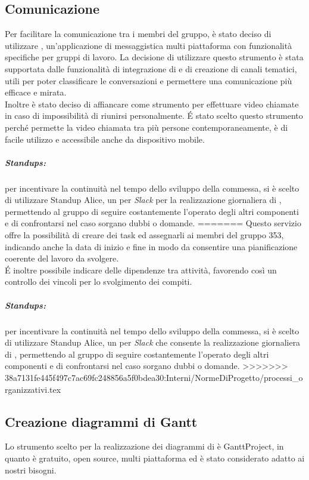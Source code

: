 \documentclass[NormeDiProgetto.tex]{subfiles}
\begin{document}
	\subsection{Comunicazione}
	Per facilitare la comunicazione tra i membri del gruppo, è stato deciso di utilizzare , un'applicazione di messaggistica multi piattaforma con funzionalità specifiche per gruppi di lavoro. La decisione di utilizzare questo strumento è stata supportata dalle funzionalità di integrazione di  e di creazione di canali tematici, utili per poter classificare le conversazioni e permettere una comunicazione più efficace e mirata.\\
	Inoltre è stato deciso di affiancare  come strumento per effettuare video chiamate in caso di impossibilità di riunirsi personalmente. \'{E} stato scelto questo strumento perché permette la video chiamata tra più persone contemporaneamente, è di facile utilizzo e accessibile anche da dispositivo mobile.\\
	\subparagraph{Standups:} per incentivare la continuità nel tempo dello sviluppo della commessa, si è scelto di utilizzare Standup Alice, un  per \emph{Slack} per la realizzazione giornaliera di , permettendo al gruppo di seguire costantemente l'operato degli altri componenti e di confrontarsi nel caso sorgano dubbi o domande.
=======
	Questo servizio offre la possibilità di creare dei task ed assegnarli ai membri del gruppo 353, indicando anche la data di inizio e fine in modo da consentire una pianificazione coerente del lavoro da svolgere.\\
	\'{E} inoltre possibile indicare delle dipendenze tra attività, favorendo così un controllo dei vincoli per lo svolgimento dei compiti.\\

	\subparagraph{Standups:} per incentivare la continuità nel tempo dello sviluppo della commessa, si è scelto di utilizzare Standup Alice, un  per \emph{Slack} che consente la realizzazione giornaliera di , permettendo al gruppo di seguire costantemente l'operato degli altri componenti e di confrontarsi nel caso sorgano dubbi o domande.
>>>>>>> 38a7131fe445f497c7ac69fc248856a5f0bdea30:Interni/NormeDiProgetto/processi_organizzativi.tex
	\subsection{Creazione diagrammi di Gantt}
	Lo strumento scelto per	la realizzazione dei diagrammi di  è GanttProject, in quanto è gratuito, open source, multi piattaforma ed è stato considerato adatto ai nostri bisogni.
\end{document}
